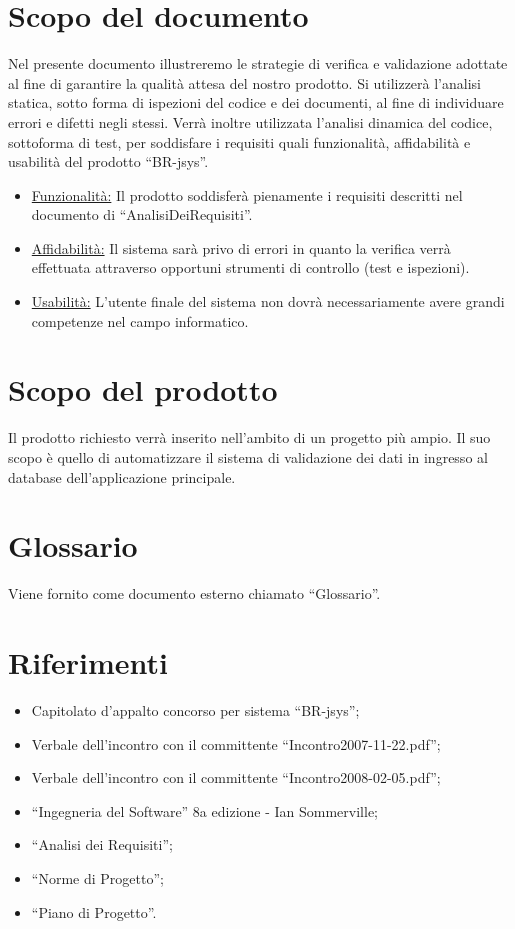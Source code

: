 \documentclass[11pt,titlepage,a4paper]{report}
\begin{document}
\section{Scopo del documento}
Nel presente documento illustreremo le strategie di verifica e validazione adottate al fine di garantire la qualit\`a attesa del nostro prodotto. Si utilizzer\`a l'analisi statica, sotto forma di ispezioni del codice e dei documenti, al fine di individuare errori e difetti negli stessi. Verr\`a inoltre utilizzata l'analisi dinamica del codice, sottoforma di test, per soddisfare i requisiti quali funzionalit\`a, affidabilit\`a e usabilit\`a del prodotto ``BR-jsys''.
\begin{itemize}
\item \underline{Funzionalit\`a:} \newline
Il prodotto soddisfer\`a pienamente i requisiti descritti nel documento di ``AnalisiDeiRequisiti''.
\item \underline{Affidabilit\`a:} \newline
Il sistema sar\`a privo di errori in quanto la verifica verr\`a effettuata attraverso opportuni strumenti di controllo (test e ispezioni).
\item \underline{Usabilit\`a:} \newline
L'utente finale del sistema non dovr\`a necessariamente avere grandi competenze nel campo informatico.
\end{itemize}

\section{Scopo del prodotto}
Il prodotto richiesto verr\`a inserito nell'ambito di un progetto pi\`u ampio. Il suo scopo \`e quello di automatizzare il sistema di validazione dei dati in ingresso al database dell'applicazione principale.

\section{Glossario}
Viene fornito come documento esterno chiamato ``Glossario''.
\section{Riferimenti}
\begin{itemize}
\item Capitolato d'appalto concorso per sistema ``BR-jsys'';
\item Verbale dell'incontro con il committente ``Incontro2007-11-22.pdf'';
\item Verbale dell'incontro con il committente ``Incontro2008-02-05.pdf'';
\item ``Ingegneria del Software'' 8a edizione - Ian Sommerville;
\item ``Analisi dei Requisiti'';
\item ``Norme di Progetto'';
\item ``Piano di Progetto''.
\end{itemize}
\end{document}
